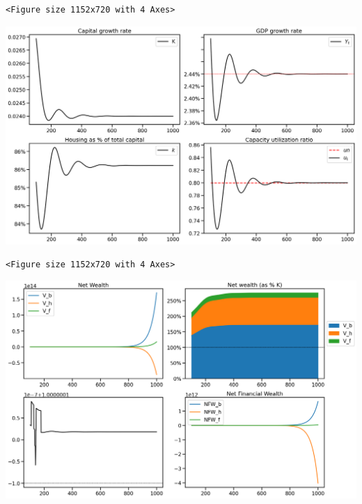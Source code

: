 \documentclass[11pt]{article}
\begin{document}
\begin{verbatim}
<Figure size 1152x720 with 4 Axes>
\end{verbatim}


\begin{center}
\includegraphics[width=.9\linewidth]{obipy-resources/833ba20b4aec1c9746a2e4fcac62a826eabb201d/8553cac7719c5823ba4bd17e31ed9e468f656cb9.png}
\end{center}

\begin{verbatim}
<Figure size 1152x720 with 4 Axes>
\end{verbatim}


\begin{center}
\includegraphics[width=.9\linewidth]{obipy-resources/833ba20b4aec1c9746a2e4fcac62a826eabb201d/11f3f05ec76746c8aa34965d6b2ffc36e7ec603a.png}
\end{center}
\end{document}

